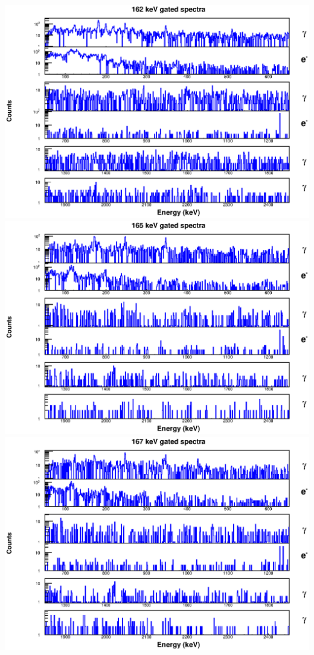 \begin{landscape}
\includegraphics[scale=1.1]{154Gd_Appendix/162_combined.eps}
\includegraphics[scale=1.1]{154Gd_Appendix/165_combined.eps}
\includegraphics[scale=1.1]{154Gd_Appendix/167_combined.eps}

\end{landscape}
